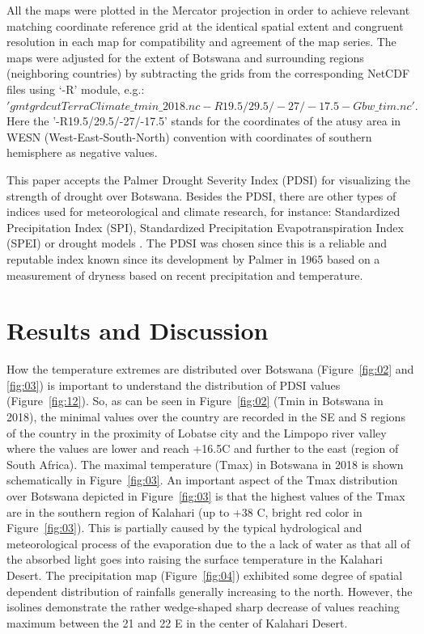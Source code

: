 \documentclass[ijgi,article,submit,pdftex,moreauthors]{Definitions/mdpi}
\begin{document}
All the maps were plotted in the Mercator projection in order to achieve relevant matching coordinate reference grid at the identical spatial extent and congruent resolution in each map for compatibility and agreement of the map series. The maps were adjusted for the extent of Botswana and surrounding regions (neighboring countries) by subtracting the grids from the corresponding NetCDF files using ‘-R’ module, e.g.: $'gmt grdcut TerraClimate\_tmin\_2018.nc -R19.5/29.5/-27/-17.5 -Gbw\_tim.nc'.$ Here the '-R19.5/29.5/-27/-17.5' stands for the coordinates of the atusy area in WESN (West-East-South-North) convention with coordinates of southern hemisphere as negative values.

This paper accepts the Palmer Drought Severity Index (PDSI) for visualizing the strength of drought over Botswana. Besides the PDSI, there are other types of indices used for meteorological and climate research, for instance: Standardized Precipitation Index (SPI), Standardized Precipitation Evapotranspiration Index (SPEI)\cite{Byakatonda2018b,Byakatonda2018c} or drought models \cite{Ujeneza,AkinyemiAbiodun}. The PDSI was chosen since this is a reliable and reputable index known since its development by Palmer in 1965 \cite{Palmer} based on a measurement of dryness based on recent precipitation and temperature. 

\section{Results and Discussion}

How the temperature extremes are distributed over Botswana (Figure~\ref{fig:02} and \ref{fig:03}) is important to understand the distribution of PDSI values (Figure~\ref{fig:12}). So, as can be seen in Figure~\ref{fig:02} (Tmin in Botswana in 2018), the minimal values over the country are recorded in the SE and S regions of the country in the proximity of Lobatse city and the Limpopo river valley where the values are lower and reach +16.5C and further to the east (region of South Africa). The maximal temperature (Tmax) in Botswana in 2018 is shown schematically in Figure~\ref{fig:03}. An important aspect of the Tmax distribution over Botswana depicted in Figure~\ref{fig:03} is that the highest values of the Tmax are in the southern region of Kalahari (up to +38 C, bright red color in Figure~\ref{fig:03}). This is partially caused by the typical hydrological and meteorological process of the evaporation due to the a lack of water as that all of the absorbed light goes into raising the surface temperature in the Kalahari Desert. The precipitation map (Figure~\ref{fig:04}) exhibited some degree of spatial dependent distribution of rainfalls generally increasing to the north. However, the isolines demonstrate the rather wedge-shaped sharp decrease of values reaching maximum between the 21 and 22 E in the center of Kalahari Desert.  
\end{document}
